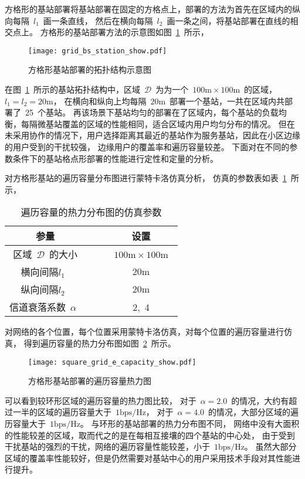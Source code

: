 方格形的基站部署将基站部署在固定的方格点上，部署的方法为首先在区域内的纵向每隔~$l_1$~画一条直线，
然后在横向每隔~$l_2$~画一条之间，将基站部署在直线的相交点上。
方格形的基站部署方法的示意图如图~\ref{grid_bs_station_show}~所示，
\begin{figure}[htbp]
\centering
\texttt{[image: grid\_bs\_station\_show.pdf]}
\caption{方格形基站部署的拓扑结构示意图}\vspace{-0.5em}
\label{grid_bs_station_show}
\end{figure}
在图~\ref{grid_bs_station_show}~所示的基站拓扑结构中，区域~$\mathcal{D}$~为为一个~$100\mathrm{m}\times 100 \mathrm{m}$~的区域，
$l_1=l_2=20\mathrm{m}$，
在横向和纵向上均每隔~$20\mathrm{m}$~部署一个基站，一共在区域内共部署了~25~个基站。
再该场景下基站均匀的部署在了区域内，每个基站的负载均衡，每隔微基站覆盖的区域的性能相同，适合区域内用户均匀分布的情况。
但在未采用协作的情况下，用户选择距离其最近的基站作为服务基站，因此在小区边缘的用户受到的干扰较强，
边缘用户的覆盖率和遍历容量较差。
下面对在不同的参数条件下的基站格点形部署的性能进行定性和定量的分析。

对方格形基站的遍历容量分布图进行蒙特卡洛仿真分析，
仿真的参数表如表~\ref{square_grid_sinr_sim_para}~所示，
\begin{table}[htbp]
\caption{遍历容量的热力分布图的仿真参数}
\label{square_grid_sinr_sim_para}
\vspace{0.5em}\centering\wuhao
\begin{tabular}{cccc}
\toprule[1.5pt]
参量 & & & 设置 \\
\midrule[0.5pt]
区域~$\mathcal{D}$~的大小  & & & ~$100\mathrm{m} \times 100 \mathrm{m}$~ \\
横向间隔$l_1$~ & & &  ${20\mathrm{m}}$\\
纵向间隔$l_2$~ & & &  ${20\mathrm{m}}$\\
信道衰落系数~$\alpha$~  & & & 2,~4\\
\bottomrule[1.5pt]
\end{tabular}
\end{table}
对网络的各个位置，每个位置采用蒙特卡洛仿真，对每个位置的遍历容量进行仿真，
得到遍历容量的热力分布图如图~\ref{square_grid_e_capacity_show}~所示。
\begin{figure}[htbp]
\centering
\texttt{[image: square\_grid\_e\_capacity\_show.pdf]}
\caption{方格形基站部署的遍历容量热力图}\vspace{-0.5em}
\label{square_grid_e_capacity_show}
\end{figure}
可以看到较环形区域的遍历容量的热力图比较，
对于~$\alpha=2.0$~的情况，大约有超过一半的区域的遍历容量大于~$1\mathrm{bps/Hz}$，
对于~$\alpha=4.0$~的情况，大部分区域的遍历容量大于~$1\mathrm{bps/Hz}$。
与环形的基站部署的热力分布图不同，
网络中没有大面积的性能较差的区域，取而代之的是在每相互接壤的四个基站的中心处，
由于受到干扰基站的强烈的干扰，网络的遍历容量性能较差，小于~$1\mathrm{bps/Hz}$。
虽然大部分区域的覆盖率性能较好，但是仍然需要对基站中心的用户采用技术手段对其性能进行提升。

